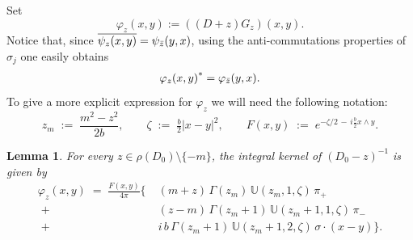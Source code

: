 \documentclass[11pt,a4paper,reqno,oneside]{amsproc}
\numberwithin{equation}{section}
\def\var{\varphi}
\newtheorem{lemma}[definition]{Lemma}
\begin{document}
Set
\begin{equation*}
\varphi_z(x,y):=((D+z)G_z)(x,y).
\end{equation*}
Notice that, since $\overline{\psi_z(x,y)}=\psi_{\Bar{z}}(y,x)$, using the anti-commutations properties of $\sigma_j$ one easily obtains
\begin{align}\label{var_ast}
     {\varphi_z(x,y)}^*=\varphi_{\Bar{z}}(y,x).
    \end{align}
To give a more explicit expression for $\varphi_z$ we will need the following notation: 
\begin{equation}\label{notation}
z_m\;:=\;\frac{m^2-z^2}{2b}, \qquad \zeta\;:=\;\tfrac{b}{2}|x-y|^2, \qquad F(x,y)\;:=\;e^{-\zeta/2 \,-\, i\frac{b}{2}x\wedge y}. 
\end{equation}


\begin{lemma}\label{prop:explicit_varphi}
For every $z\in\rho(D_0)\setminus\{- m\}$, the integral kernel of $(D_0-z)^{-1}$ is given by
\begin{equation}\label{varphi_z}
\begin{aligned}
\var_z(x,y)\;=\;\frac{F(x,y)}{4\pi}\bigg\{\;
&(m+z)\,\Gamma(z_m)\,\mathbb{U}(z_m,1,\zeta)\,\pi_+ \\
\;+\;&(z-m)\,\Gamma(z_m+1)\,\mathbb{U}(z_m+1,1,\zeta)\,\pi_- \\
\;+\;&i\,b\,\Gamma(z_m+1)\,\mathbb{U}(z_m+1,2,\zeta)\,\sigma\!\cdot\!(x-y)\bigg\}.
\end{aligned}
\end{equation}
\end{lemma}
\end{document}
